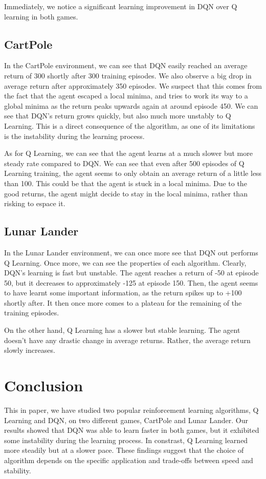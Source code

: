 \documentclass{article}
\begin{document}
Immediately, we notice a significant learning improvement in DQN over Q
learning in both games.

\subsection{CartPole}
In the CartPole environment, we can see that DQN easily reached an average
return of 300 shortly after 300 training episodes. We also observe a big drop
in average return after approximately 350 episodes. We suspect that this comes
from the fact that the agent escaped a local minima, and tries to work its way
to a global minima as the return peaks upwards again at around episode 450. We
can see that DQN's return grows quickly, but also much more unstably to Q
Learning. This is a direct consequence of the algorithm, as one of its
limitations is the instability during the learning process.

As for Q Learning, we can see that the agent learns at a much slower but more
steady rate compared to DQN. We can see that even after 500 episodes of Q
Learning training, the agent seems to only obtain an average return of a little
less than 100. This could be that the agent is stuck in a local minima. Due to
the good returns, the agent might decide to stay in the local minima, rather
than risking to espace it.

\subsection{Lunar Lander}
In the Lunar Lander environment, we can once more see that DQN out performs Q
Learning. Once more, we can see the properties of each algorithm. Clearly,
DQN's learning is fast but unstable. The agent reaches a return of -50 at
episode 50, but it decreases to approximately -125 at episode 150. Then, the
agent seems to have learnt some important information, as the return spikes up
to +100 shortly after. It then once more comes to a plateau for the remaining
of the training episodes.

On the other hand, Q Learning has a slower but stable learning. The agent
doesn't have any drastic change in average returns. Rather, the average return
slowly increases.

\section{Conclusion}
This in paper, we have studied two popular reinforcement learning algorithms, Q
Learning and DQN, on two different games, CartPole and Lunar Lander. Our
results showed that DQN was able to learn faster in both games, but it
exhibited some instability during the learning process. In constrast, Q
Learning learned more steadily but at a slower pace. These findings suggest
that the choice of algorithm depends on the specific application and trade-offs
between speed and stability.
\end{document}
